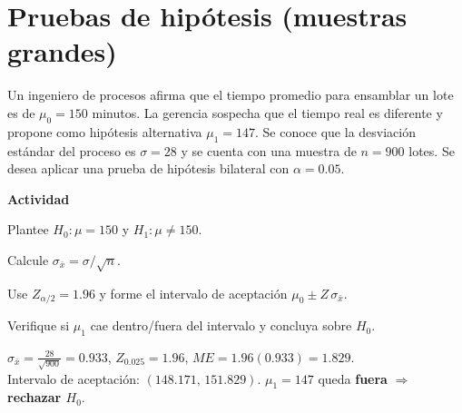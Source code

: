 
\section{Pruebas de hipótesis (muestras grandes)}

\begin{ejercicio}[Duración de lotes en línea de ensamble (n=900)]
Un ingeniero de procesos afirma que el tiempo promedio para ensamblar un lote
es de $\mu_0=150$ minutos. La gerencia sospecha que el tiempo real es diferente
y propone como hipótesis alternativa $\mu_1=147$. Se conoce que la desviación
estándar del proceso es $\sigma=28$ y se cuenta con una muestra de $n=900$ lotes.
Se desea aplicar una prueba de hipótesis bilateral con $\alpha=0.05$.


\textbf{Actividad}
\begin{pasos}
  \item Plantee $H_0:\mu=150$ y $H_1:\mu\neq150$.
  \item Calcule $\sigma_{\bar{x}}=\sigma/\sqrt{n}$.
  \item Use $Z_{\alpha/2}=1.96$ y forme el intervalo de aceptación $\mu_0\pm Z\,\sigma_{\bar{x}}$.
  \item Verifique si $\mu_1$ cae dentro/fuera del intervalo y concluya sobre $H_0$.
\end{pasos}

\begin{clave}
$\sigma_{\bar{x}}=\frac{28}{\sqrt{900}}=0.933$, \;
$Z_{0.025}=1.96$, \;
$ME=1.96(0.933)=1.829$.\\
Intervalo de aceptación: $(148.171,\,151.829)$. \;
$\mu_1=147$ queda \textbf{fuera} $\Rightarrow$ \textbf{rechazar $H_0$}.
\end{clave}
\end{ejercicio}


